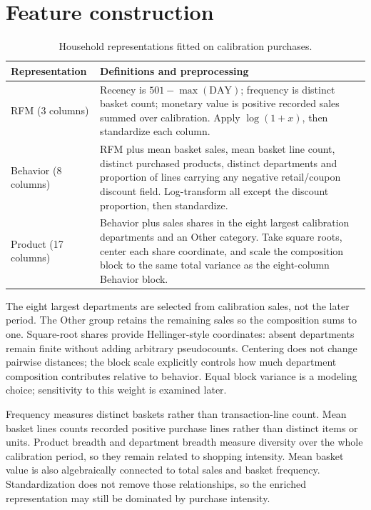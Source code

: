 \section{Feature construction}
\begin{table}[htbp]
\centering\small
\caption{Household representations fitted on calibration purchases.}
\label{tab:features}
\begin{tabularx}{\textwidth}{p{28mm}X}
\toprule
Representation & Definitions and preprocessing\\
\midrule
RFM (3 columns) & Recency is $501-\max(\mathrm{DAY})$; frequency is distinct basket count; monetary value is positive recorded sales summed over calibration. Apply $\log(1+x)$, then standardize each column.\\
Behavior (8 columns) & RFM plus mean basket sales, mean basket line count, distinct purchased products, distinct departments and proportion of lines carrying any negative retail/coupon discount field. Log-transform all except the discount proportion, then standardize.\\
Product (17 columns) & Behavior plus sales shares in the eight largest calibration departments and an Other category. Take square roots, center each share coordinate, and scale the composition block to the same total variance as the eight-column Behavior block.\\
\bottomrule
\end{tabularx}
\end{table}
The eight largest departments are selected from calibration sales, not the later period. The Other group retains the remaining sales so the composition sums to one. Square-root shares provide Hellinger-style coordinates: absent departments remain finite without adding arbitrary pseudocounts. Centering does not change pairwise distances; the block scale explicitly controls how much department composition contributes relative to behavior. Equal block variance is a modeling choice; sensitivity to this weight is examined later.

Frequency measures distinct baskets rather than transaction-line count. Mean basket lines counts recorded positive purchase lines rather than distinct items or units. Product breadth and department breadth measure diversity over the whole calibration period, so they remain related to shopping intensity. Mean basket value is also algebraically connected to total sales and basket frequency. Standardization does not remove those relationships, so the enriched representation may still be dominated by purchase intensity.

